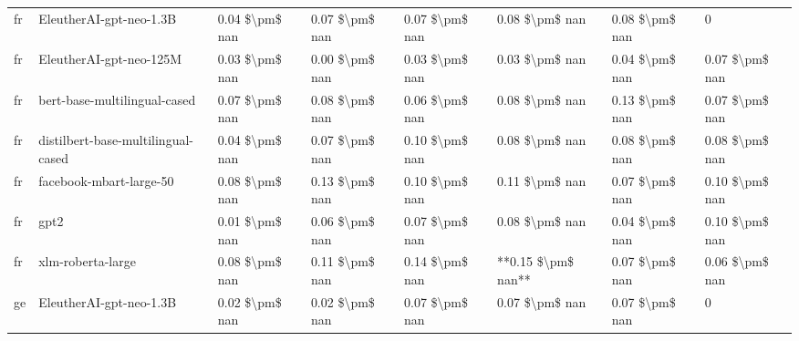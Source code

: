 \begin{tabular}{llllllll}
      fr &            EleutherAI-gpt-neo-1.3B & 0.04 \$\textbackslash pm\$ nan &            0.07 \$\textbackslash pm\$ nan &        0.07 \$\textbackslash pm\$ nan &         0.08 \$\textbackslash pm\$ nan &                          0.08 \$\textbackslash pm\$ nan &                  0 \\
      fr &            EleutherAI-gpt-neo-125M & 0.03 \$\textbackslash pm\$ nan &            0.00 \$\textbackslash pm\$ nan &        0.03 \$\textbackslash pm\$ nan &         0.03 \$\textbackslash pm\$ nan &                          0.04 \$\textbackslash pm\$ nan &     0.07 \$\textbackslash pm\$ nan \\
      fr &       bert-base-multilingual-cased & 0.07 \$\textbackslash pm\$ nan &            0.08 \$\textbackslash pm\$ nan &        0.06 \$\textbackslash pm\$ nan &         0.08 \$\textbackslash pm\$ nan &                          0.13 \$\textbackslash pm\$ nan &     0.07 \$\textbackslash pm\$ nan \\
      fr & distilbert-base-multilingual-cased & 0.04 \$\textbackslash pm\$ nan &            0.07 \$\textbackslash pm\$ nan &        0.10 \$\textbackslash pm\$ nan &         0.08 \$\textbackslash pm\$ nan &                          0.08 \$\textbackslash pm\$ nan &     0.08 \$\textbackslash pm\$ nan \\
      fr &            facebook-mbart-large-50 & 0.08 \$\textbackslash pm\$ nan &            0.13 \$\textbackslash pm\$ nan &        0.10 \$\textbackslash pm\$ nan &         0.11 \$\textbackslash pm\$ nan &                          0.07 \$\textbackslash pm\$ nan &     0.10 \$\textbackslash pm\$ nan \\
      fr &                               gpt2 & 0.01 \$\textbackslash pm\$ nan &            0.06 \$\textbackslash pm\$ nan &        0.07 \$\textbackslash pm\$ nan &         0.08 \$\textbackslash pm\$ nan &                          0.04 \$\textbackslash pm\$ nan &     0.10 \$\textbackslash pm\$ nan \\
      fr &                  xlm-roberta-large & 0.08 \$\textbackslash pm\$ nan &            0.11 \$\textbackslash pm\$ nan &        0.14 \$\textbackslash pm\$ nan &     **0.15 \$\textbackslash pm\$ nan** &                          0.07 \$\textbackslash pm\$ nan &     0.06 \$\textbackslash pm\$ nan \\
      ge &            EleutherAI-gpt-neo-1.3B & 0.02 \$\textbackslash pm\$ nan &            0.02 \$\textbackslash pm\$ nan &        0.07 \$\textbackslash pm\$ nan &         0.07 \$\textbackslash pm\$ nan &                          0.07 \$\textbackslash pm\$ nan &                  0 \\

\end{tabular}
